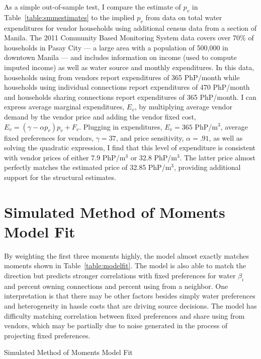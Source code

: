 \documentclass[12pt]{article}
\begin{document}
\begin{appendices}
As a simple out-of-sample test, I compare the estimate of $p_v$ in Table~\ref{table:smmestimates} to the implied $p_v$ from data on total water expenditures for vendor households using additional census data from a section of Manila. The 2011 Community Based Monitoring System data covers over 70\% of households in Pasay City --- a large area with a population of 500,000 in downtown Manila --- and includes information on income (used to compute imputed income) as well as water source and monthly expenditures.  In this data, households using from vendors report expenditures of 365 PhP/month while households using individual connections report expenditures of 470 PhP/month and households sharing connections report expenditures of 365 PhP/month.  I can express average marginal expenditures, $E_v$, by multiplying average vendor demand by the vendor price and adding the vendor fixed cost, $E_v = (\gamma - \alpha p_v) p_v + F_v$.  Plugging in expenditures, $E_v =365$ PhP/$\text{m}^{3}$, average fixed preferences for vendors, $\gamma=37$, and price sensitivity, $\alpha=.91$, as well as solving the quadratic expression, I find that this level of expenditure is consistent with vendor prices of either 7.9 PhP/$\text{m}^{3}$ or 32.8 PhP/$\text{m}^{3}$.  The latter price almost perfectly matches the estimated price of 32.85 PhP/$\text{m}^3$, providing additional support for the structural estimates.



\section{Simulated Method of Moments Model Fit}\label{appendix:modelfit}


By weighting the first three moments highly, the model almost exactly matches moments shown in Table~\ref{table:modelfit}.  The model is also able to match the direction but predicts stronger correlations with fixed preferences for water $\beta_i$ and percent owning connections and percent using from a neighbor.  One interpretation is that there may be other factors besides simply water preferences and heterogeneity in hassle costs that are driving source decisions.  The model has difficulty matching correlation between fixed preferences and share using from vendors, which may be partially due to noise generated in the process of projecting fixed preferences.

\begin{table}
\centering
\caption{Simulated Method of Moments Model Fit}\label{table:modelfit}

\end{table}


\end{appendices}
\end{document}

